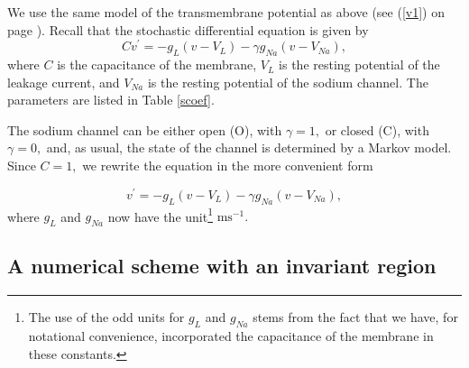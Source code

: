 We use the same model of the transmembrane potential as above (see
(\ref{v1}) on page \pageref{v1}). Recall that the stochastic differential equation is
given by%
\begin{equation}
Cv^{\prime}=-g_{L}\left(  v-V_{L}\right)  -\gamma g_{Na}(v-V_{Na}), \label{sv1}%
\end{equation}
where $C$ is the capacitance of the membrane, $V_{L}$ is the resting potential
of the leakage current, and $V_{Na}$ is the resting potential of the sodium
channel. The parameters are listed in Table \ref{scoef}.


The sodium channel can be either open (O), with $\gamma=1,$ or closed (C), with
$\gamma=0,$ and, as usual, the state of the channel is determined by a Markov
model. Since $C=1,$ we rewrite the equation in the more convenient form%

\begin{equation}
v^{\prime}=-g_{L}\left(  v-V_{L}\right)  -\gamma g_{Na}(v-V_{Na}), \label{sv2}%
\end{equation}
where $g_{L}$ and $g_{Na}$ now have the unit\footnote{The use of the odd units for 
$g_{L}$ and $g_{Na}$ stems from the fact that we have, for notational
 convenience, incorporated the capacitance of the membrane in these constants.}
$\text{ms}^{-1}.$

\subsection{A numerical scheme with an invariant region}

